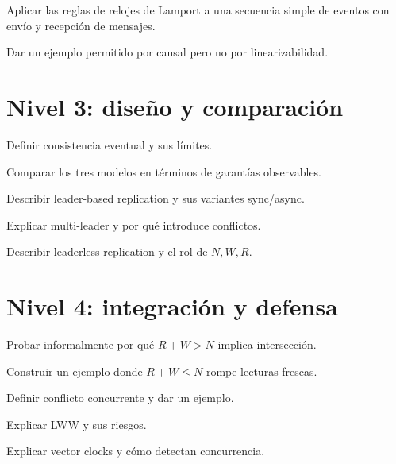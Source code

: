 \documentclass[variant=guia,cover=institutional,mode=screen]{ua-engineering-v6-article}
\begin{document}
\begin{uaexercise}
Aplicar las reglas de relojes de Lamport a una secuencia simple de eventos con envío y recepción de mensajes.
\end{uaexercise}

\begin{uaexercise}
Dar un ejemplo permitido por causal pero no por linearizabilidad.
\end{uaexercise}


\section{Nivel 3: diseño y comparación}
\begin{uaexercise}
Definir consistencia eventual y sus límites.
\end{uaexercise}

\begin{uaexercise}
Comparar los tres modelos en términos de garantías observables.
\end{uaexercise}

\begin{uaexercise}
Describir leader-based replication y sus variantes sync/async.
\end{uaexercise}

\begin{uaexercise}
Explicar multi-leader y por qué introduce conflictos.
\end{uaexercise}

\begin{uaexercise}
Describir leaderless replication y el rol de $N,W,R$.
\end{uaexercise}


\section{Nivel 4: integración y defensa}
\begin{uaexercise}
Probar informalmente por qué $R+W>N$ implica intersección.
\end{uaexercise}

\begin{uaexercise}
Construir un ejemplo donde $R+W\le N$ rompe lecturas frescas.
\end{uaexercise}

\begin{uaexercise}
Definir conflicto concurrente y dar un ejemplo.
\end{uaexercise}

\begin{uaexercise}
Explicar LWW y sus riesgos.
\end{uaexercise}

\begin{uaexercise}
Explicar vector clocks y cómo detectan concurrencia.
\end{uaexercise}
\end{document}
